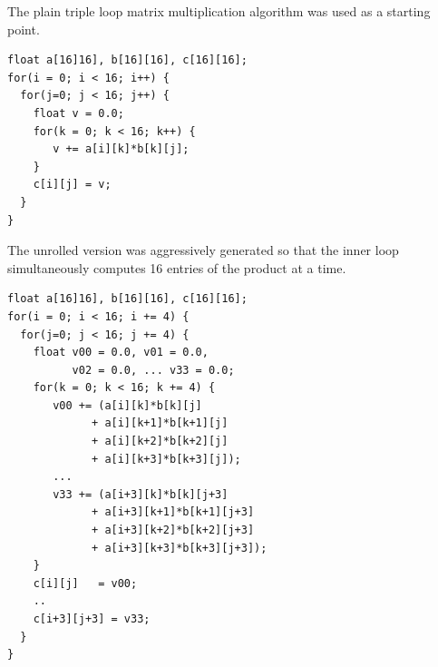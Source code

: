 \documentclass[conference]{IEEEtran}
\begin{document}
The plain triple loop matrix multiplication algorithm was
used as a starting point.
\begin{verbatim}
float a[16]16], b[16][16], c[16][16];
for(i = 0; i < 16; i++) {
  for(j=0; j < 16; j++) {
    float v = 0.0;
    for(k = 0; k < 16; k++) {
       v += a[i][k]*b[k][j];
    }
    c[i][j] = v;
  }
}
\end{verbatim}
The unrolled version was aggressively generated so that
the inner loop simultaneously computes 16 entries of the
product at a time.
\begin{verbatim}
float a[16]16], b[16][16], c[16][16];
for(i = 0; i < 16; i += 4) {
  for(j=0; j < 16; j += 4) {
    float v00 = 0.0, v01 = 0.0,
          v02 = 0.0, ... v33 = 0.0;
    for(k = 0; k < 16; k += 4) {
       v00 += (a[i][k]*b[k][j] 
             + a[i][k+1]*b[k+1][j]
             + a[i][k+2]*b[k+2][j]
             + a[i][k+3]*b[k+3][j]);
       ...
       v33 += (a[i+3][k]*b[k][j+3] 
             + a[i+3][k+1]*b[k+1][j+3]
             + a[i+3][k+2]*b[k+2][j+3]
             + a[i+3][k+3]*b[k+3][j+3]);
    }
    c[i][j]   = v00;
    ..
    c[i+3][j+3] = v33;
  }
}
\end{verbatim}
\end{document}
